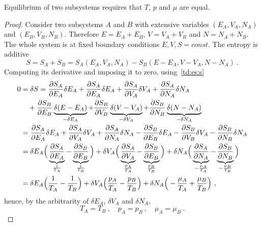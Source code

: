     Equilibrium of two subsystems requires that $T$, $p$ and $\mu$ are equal.
    \begin{proof}
        Consider two subsystems $A$ and $B$ with extensive variables $(E_A, V_A, N_A)$ and $(E_B, V_B, N_B)$. Therefore $E = E_A + E_B$, $V = V_A + V_B$ and $N = N_A + N_B$. The whole system is at fixed boundary conditions $E, V, S = const$. The entropy is additive 
        \begin{equation*}
            S = S_A + S_B = S_A(E_A, V_A, N_A) - S_B(E - E_A, V-V_A, N-N_A) ~.
        \end{equation*}
        Computing its derivative and imposing it to zero, using~\eqref{td:es:s}
        \begin{equation*}
        \begin{aligned}
            0 & = \delta S = \frac{\partial S_A}{\partial E_A} \delta E_A + \frac{\partial S_A}{\partial E_A} \delta E_A + \frac{\partial S_A}{\partial V_A} \delta V_A + \frac{\partial S_A}{\partial N_A} \delta N_A \\ & \quad + \frac{\partial S_B}{\partial E_B} \underbrace{\delta (E - E_A)}_{- \delta E_A} + \frac{\partial S_B}{\partial V_B} \underbrace{\delta (V - V_A)}_{- \delta V_A} + \frac{\partial S_B}{\partial N_B} \underbrace{\delta (N - N_A)}_{- \delta N_A} \\ & = \frac{\partial S_A}{\partial E_A} \delta E_A + \frac{\partial S_A}{\partial V_A} \delta V_A + \frac{\partial S_A}{\partial N_A} \delta N_A - \frac{\partial S_B}{\partial E_B} \delta E_A - \frac{\partial S_B}{\partial V_B}  \delta V_A - \frac{\partial S_B}{\partial N_B} \delta N_A  \\ & = \delta E_A \Big ( \underbrace{\frac{\partial S_A}{\partial E_A}}_{\frac{1}{T_A}} - \underbrace{\frac{\partial S_B}{\partial E_B}}_{\frac{1}{T_B}} \Big) + \delta V_A \Big ( \underbrace{\frac{\partial S_A}{\partial V_A}}_{\frac{p_A}{T_A}} - \underbrace{\frac{\partial S_B}{\partial E_B}}_{\frac{p_B}{T_B}} \Big) + \delta N_A \Big (\underbrace{\frac{\partial S_A}{\partial N_A}}_{ - \frac{\mu_A}{T_A}} - \underbrace{\frac{\partial S_B}{\partial N_B}}_{- \frac{\mu_B}{T_B}} \Big) \\ & = \delta E_A \Big ( \frac{1}{T_A} - \frac{1}{T_B} \Big) + \delta V_A \Big ( \frac{p_A}{T_A} - \frac{p_B}{T_B} \Big) + \delta N_A \Big (- \frac{\mu_A}{T_A} + \frac{\mu_B}{T_B} \Big) ~,
        \end{aligned}
        \end{equation*}
        hence, by the arbitrarity of $\delta E_A$, $\delta V_A$ and $\delta N_A$,
        \begin{equation*}
            T_A = T_B ~, \quad p_A = p_B ~, \quad \mu_A = \mu_B ~.
        \end{equation*}
    \end{proof}

